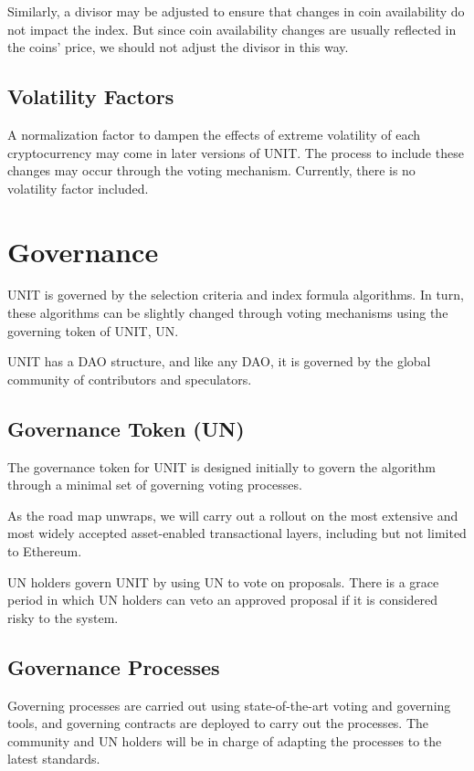 \documentclass[12pt]{article}
\begin{document}
Similarly, a divisor may be adjusted to ensure that changes in coin availability do not impact the index. But since coin availability changes are usually reflected in the coins' price, we should not adjust the divisor in this way.

\subsection{Volatility Factors}

A normalization factor to dampen the effects of extreme volatility of each cryptocurrency may come in later versions of UNIT. The process to include these changes may occur through the voting mechanism. Currently, there is no volatility factor included.

\section{Governance}

UNIT is governed by the selection criteria and index formula algorithms. In turn, these algorithms can be slightly changed through voting mechanisms using the governing token of UNIT, UN.

UNIT has a DAO structure, and like any DAO, it is governed by the global community of contributors and speculators. 

\subsection{Governance Token (UN)}

The governance token for UNIT is designed initially to govern the algorithm through a minimal set of governing voting processes. 

As the road map unwraps, we will carry out a rollout on the most extensive and most widely accepted asset-enabled transactional layers, including but not limited to Ethereum.

UN holders govern UNIT by using UN to vote on proposals. There is a grace period in which UN holders can veto an approved proposal if it is considered risky to the system.

\subsection{Governance Processes}

Governing processes are carried out using state-of-the-art voting and governing tools, and governing contracts are deployed to carry out the processes. The community and UN holders will be in charge of adapting the processes to the latest standards.
\end{document}
